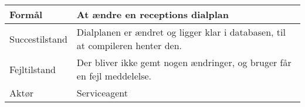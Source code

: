 


\begin{table}[h]
    \begin{tabular}{|p{3cm}|p{8.3cm}|}
    \hline
    Formål         & At ændre en receptions dialplan                              \\ \hline
    Succestilstand & Dialplanen er ændret og ligger klar i databasen, til at compileren henter den.                         \\ \hline
    Fejltilstand   & Der bliver ikke gemt nogen ændringer, og bruger får en fejl meddelelse. \\ \hline
    Aktør          & Serviceagent                                                                \\ \hline
    \end{tabular}
\end{table}

